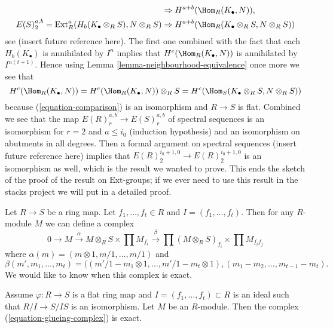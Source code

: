 \begin{remark}
\begin{align*}
& \Rightarrow
H^{a + b}(\Hom_R(K_\bullet, N)), \\
E(S)_2^{a, b} = \text{Ext}^a_R(H_b(K_\bullet \otimes_R S), N \otimes_R S)
& \Rightarrow
H^{a + b}(\Hom_R(K_\bullet \otimes_R S, N \otimes_R S))
\end{align*}
see (insert future reference here).
The first one combined with the fact that each $H_b(K_\bullet)$
is annihilated by $I^n$ implies that $H^c(\Hom_R(K_\bullet, N))$
is annihilated by $I^{n(t + 1)}$. Hence using
Lemma \ref{lemma-neighbourhood-equivalence}
once more we see that
$$
H^c(\Hom_R(K_\bullet, N)) =
H^c(\Hom_R(K_\bullet, N)) \otimes_R S =
H^c(\Hom_S(K_\bullet \otimes_R S, N \otimes_R S))
$$
because (\ref{equation-comparison}) is an isomorphism and $R \to S$ is flat.
Combined we see that the map $E(R)_r^{a, b} \to E(S)_r^{a, b}$ of spectral
sequences is an isomorphism for $r = 2$ and $a \leq i_0$ (induction hypothesis)
and an isomorphism on abutments in all degrees.
Then a formal argument on spectral sequences (insert future
reference here) implies that
$E(R)_2^{i_0 + 1, 0} \to E(R)_2^{i_0 + 1, 0}$
is an isomorphism as well, which is the result we wanted to prove.
This ends the sketch of the proof of the result on $\text{Ext}$-groups;
if we ever need to use this result in the stacks project we will put in
a detailed proof.
\end{remark}

\noindent
Let $R \to S$ be a ring map.
Let $f_1, \ldots, f_t \in R$ and $I = (f_1, \ldots, f_t)$.
Then for any $R$-module $M$ we can define a complex
\begin{equation}
\label{equation-glueing-complex}
0 \to M \xrightarrow{\alpha}
M \otimes_R S \times \prod M_{f_i} \xrightarrow{\beta}
\prod (M \otimes_R S)_{f_i}
\times
\prod M_{f_if_j}
\end{equation}
where $\alpha(m) = (m \otimes 1, m/1, \ldots, m/1)$ and
$$
\beta(m', m_1, \ldots, m_t) =
((m'/1 - m_1 \otimes 1, \ldots, m'/1 - m_t \otimes 1),
(m_1 - m_2, \ldots, m_{t - 1} - m_t).
$$
We would like to know when this complex is exact.

\begin{lemma}
\label{lemma-recover-module-from-glueing-data}
Assume $\varphi : R \to S$ is a flat ring map and
$I = (f_1, \ldots, f_t) \subset R$ is an ideal such that
$R/I \to S/IS$ is an isomorphism.
Let $M$ be an $R$-module. Then the
complex (\ref{equation-glueing-complex})
is exact.
\end{lemma}

